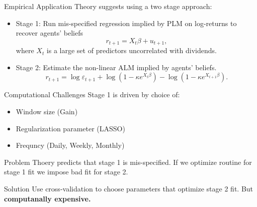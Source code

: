 \documentclass[compress,12pt]{beamer}
\begin{document}
\begin{frame}{Empirical Application}
Theory suggests using a two stage approach:
\begin{itemize}
    \item Stage 1: Run mis-specified regression implied by PLM on log-returns to recover agents' beliefs
    \begin{equation}
    r_{t+1} = X_t \beta + u_{t+1},
    \end{equation}
    where \( X_t \) is a large set of predictors uncorrelated with dividends.
    \item Stage 2: Estimate the non-linear ALM implied by agents' beliefs.
    \begin{equation}
    r_{t+1} = \log \varepsilon_{t+1}
               + \log(1 - \kappa e^{X_t \beta})
               - \log(1 - \kappa e^{X_{t+1} \beta}).
    \end{equation}
\end{itemize}
\end{frame}

\begin{frame}{Computational Challenges}
Stage 1 is driven by choice of:
\begin{itemize}
    \item Window size (Gain)
    \item Regularization parameter (LASSO)
    \item Frequncy (Daily, Weekly, Monthly)
\end{itemize}

\begin{block}{Problem}
    Thoery predicts that stage 1 is mis-specified. 
    If we optimize routine for stage 1 fit we impose bad fit for stage 2.
    
\end{block}

\begin{block}{Solution}
    Use cross-validation to choose parameters that optimize stage 2 fit.
    But \textbf{computanally expensive.}
\end{block}
\end{frame}
\end{document}

